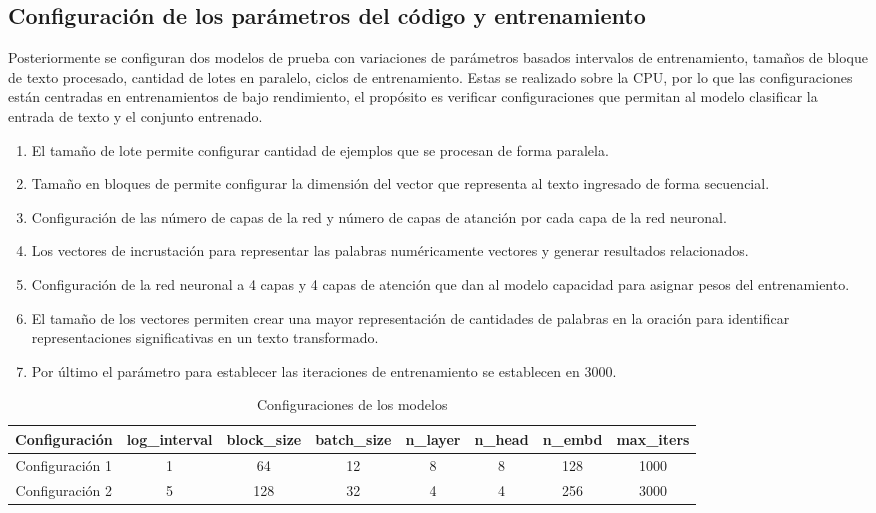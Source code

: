 \subsection{Configuración de los parámetros del código y entrenamiento}\label{section:Configuración y entrenamiento} 
Posteriormente se configuran dos modelos de prueba con variaciones de parámetros basados intervalos de entrenamiento, tamaños de bloque de texto procesado, cantidad de lotes en paralelo, ciclos de entrenamiento. 
Estas se realizado sobre la CPU, por lo que las configuraciones están centradas en entrenamientos de bajo rendimiento, el propósito es verificar configuraciones que permitan al modelo clasificar la entrada de texto y el conjunto entrenado.
\begin{enumerate}
	\item El tamaño de lote permite configurar cantidad de ejemplos que se procesan de forma paralela.
	\item Tamaño en bloques de permite configurar la dimensión del vector que representa al texto ingresado de forma secuencial.
	\item Configuración de las número de capas de la red y número de capas de atanción por cada capa de la red neuronal.
	\item Los vectores de incrustación para representar las palabras numéricamente vectores y generar resultados relacionados.
	\item Configuración de la red neuronal a 4 capas y 4 capas de atención que dan al modelo capacidad para asignar pesos del entrenamiento. 
	\item El tamaño de los vectores permiten crear una mayor representación de cantidades de palabras en la oración  para identificar representaciones significativas en un texto transformado.
	\item Por último el parámetro para establecer las iteraciones de entrenamiento se establecen en 3000. 
\end{enumerate} 
\begin{table}[H]
	\centering
	\begin{tabular}{|c|c|c|c|c|c|c|c|}
		\hline
		\textbf{Configuración} & \textbf{log\_interval} & \textbf{block\_size} & \textbf{batch\_size} & \textbf{n\_layer} & \textbf{n\_head} & \textbf{n\_embd} & \textbf{max\_iters} \\
		\hline
		Configuración 1 & 1 & 64 & 12 & 8 & 8 & 128 & 1000 \\
		Configuración 2 & 5 & 128 & 32 & 4 & 4 & 256 & 3000 \\
		\hline
	\end{tabular}
	\caption{Configuraciones de los modelos}
	\label{tab:configuraciones}
\end{table}

